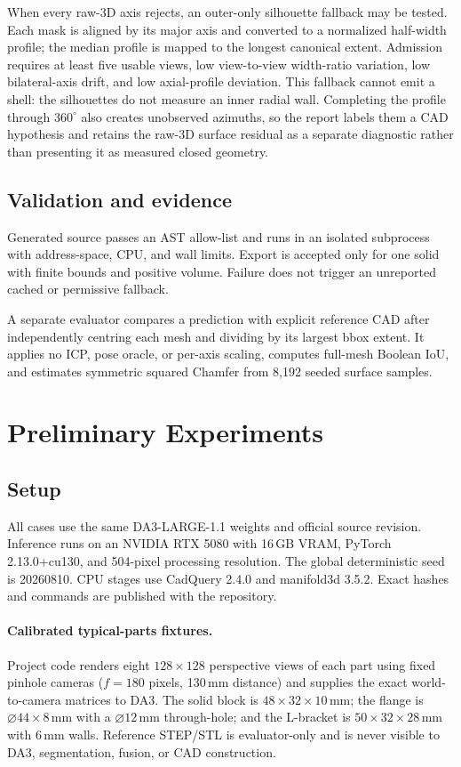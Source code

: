 \documentclass[10pt]{article}
\newcommand{\da}{DA3-LARGE-1.1}
\begin{document}
When every raw-3D axis rejects, an outer-only silhouette fallback may be tested.
Each mask is aligned by its major axis and converted to a normalized half-width
profile; the median profile is mapped to the longest canonical extent.  Admission
requires at least five usable views, low view-to-view width-ratio variation, low
bilateral-axis drift, and low axial-profile deviation.  This fallback cannot emit
a shell: the silhouettes do not measure an inner radial wall.  Completing the
profile through $360^\circ$ also creates unobserved azimuths, so the report labels
them a CAD hypothesis and retains the raw-3D surface residual as a separate
diagnostic rather than presenting it as measured closed geometry.

\subsection{Validation and evidence}

Generated source passes an AST allow-list and runs in an isolated subprocess
with address-space, CPU, and wall limits.  Export is accepted only for one solid
with finite bounds and positive volume.  Failure does not trigger an unreported
cached or permissive fallback.

A separate evaluator compares a prediction with explicit reference CAD after
independently centring each mesh
and dividing by its largest bbox extent.  It applies no ICP, pose oracle, or
per-axis scaling, computes full-mesh Boolean IoU, and estimates symmetric
squared Chamfer from 8,192 seeded surface samples.

\section{Preliminary Experiments}

\subsection{Setup}

All cases use the same \da{} weights and official source revision.  Inference
runs on an NVIDIA RTX 5080 with 16\,GB VRAM, PyTorch 2.13.0+cu130, and 504-pixel
processing resolution.  The global deterministic seed is 20260810.  CPU stages
use CadQuery 2.4.0 and manifold3d 3.5.2.  Exact hashes and commands are published
with the repository.

\paragraph{Calibrated typical-parts fixtures.}
Project code renders eight $128\times128$ perspective views of each part using
fixed pinhole cameras ($f=180$ pixels, 130\,mm distance) and supplies the exact
world-to-camera matrices to DA3.  The solid block is
$48\times32\times10$\,mm; the flange is $\varnothing44\times8$\,mm with a
$\varnothing12$\,mm through-hole; and the L-bracket is
$50\times32\times28$\,mm with 6\,mm walls.  Reference STEP/STL is evaluator-only
and is never visible to DA3, segmentation, fusion, or CAD construction.
\end{document}

